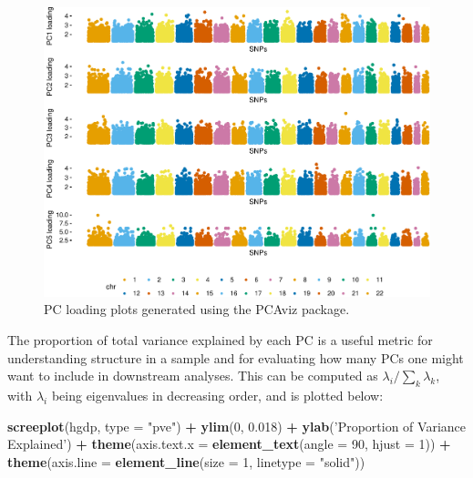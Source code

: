 \documentclass[smallextended]{svmult}       %
\newenvironment{Shaded}{\begin{snugshade}}{\end{snugshade}}
\newcommand{\KeywordTok}[1]{\textcolor[rgb]{0.13,0.29,0.53}{\textbf{#1}}}
\newcommand{\DataTypeTok}[1]{\textcolor[rgb]{0.13,0.29,0.53}{#1}}
\newcommand{\DecValTok}[1]{\textcolor[rgb]{0.00,0.00,0.81}{#1}}
\newcommand{\FloatTok}[1]{\textcolor[rgb]{0.00,0.00,0.81}{#1}}
\newcommand{\StringTok}[1]{\textcolor[rgb]{0.31,0.60,0.02}{#1}}
\newcommand{\OperatorTok}[1]{\textcolor[rgb]{0.81,0.36,0.00}{\textbf{#1}}}
\newcommand{\NormalTok}[1]{#1}
\begin{document}
\begin{figure}
\includegraphics[width=1\linewidth]{plot/unnamed-chunk-22-1} \caption{PC loading plots generated using the PCAviz package.}\label{fig:unnamed-chunk-22}
\end{figure}

The proportion of total variance explained by each PC is a useful metric
for understanding structure in a sample and for evaluating how many PCs
one might want to include in downstream analyses. This can be computed
as \(\lambda_i / \sum_{k} \lambda_k\), with \(\lambda_i\) being
eigenvalues in decreasing order, and is plotted below:

\begin{Shaded}
\begin{Highlighting}[]
\KeywordTok{screeplot}\NormalTok{(hgdp, }\DataTypeTok{type =} \StringTok{"pve"}\NormalTok{) }\OperatorTok{+}\StringTok{ }
\StringTok{  }\KeywordTok{ylim}\NormalTok{(}\DecValTok{0}\NormalTok{, }\FloatTok{0.018}\NormalTok{) }\OperatorTok{+}
\StringTok{  }\KeywordTok{ylab}\NormalTok{(}\StringTok{'Proportion of Variance Explained'}\NormalTok{) }\OperatorTok{+}
\StringTok{  }\KeywordTok{theme}\NormalTok{(}\DataTypeTok{axis.text.x =} \KeywordTok{element_text}\NormalTok{(}\DataTypeTok{angle =} \DecValTok{90}\NormalTok{, }\DataTypeTok{hjust =} \DecValTok{1}\NormalTok{)) }\OperatorTok{+}
\StringTok{  }\KeywordTok{theme}\NormalTok{(}\DataTypeTok{axis.line =} \KeywordTok{element_line}\NormalTok{(}\DataTypeTok{size =} \DecValTok{1}\NormalTok{, }\DataTypeTok{linetype =} \StringTok{"solid"}\NormalTok{))}
\end{Highlighting}
\end{Shaded}
\end{document}
